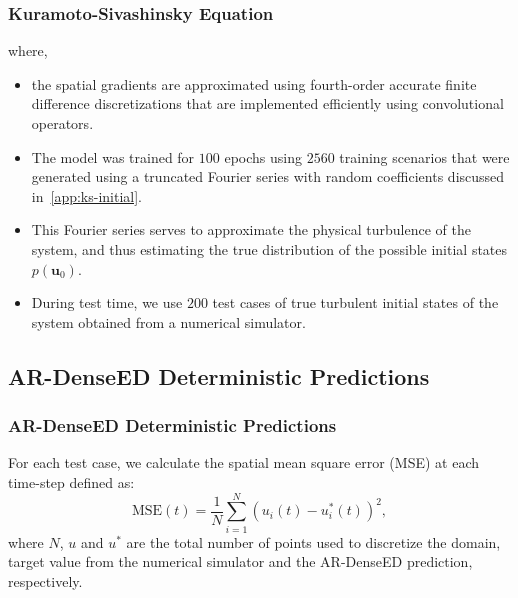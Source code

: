 \documentclass{beamer}
\theoremstyle{remark}
\begin{document}
\begin{frame}
\frametitle{Kuramoto-Sivashinsky Equation}
where,
\begin{itemize}
\item{ the spatial gradients are approximated using fourth-order accurate finite difference discretizations that are implemented efficiently using convolutional operators.}

\item{The model was trained for $100$ epochs using $2560$ training scenarios that were generated using a truncated Fourier series with random coefficients discussed in~\ref{app:ks-initial}.}

\item{This Fourier series serves to approximate the physical turbulence of the system, and thus estimating the true distribution of the possible initial states $p(\bm{u}_{0})$.}

\item{During test time, we use $200$ test cases of true turbulent initial states of the system obtained from a numerical simulator.}

\end{itemize}
\end{frame}
\subsection{AR-DenseED Deterministic Predictions}

\begin{frame}
\frametitle{AR-DenseED Deterministic Predictions}
For each test case, we calculate the spatial mean square error (MSE) at each time-step defined as:
\begin{equation}
    \textrm{MSE}(t) = \frac{1}{N}\sum^{N}_{i=1}\left(u_{i}(t)-u^{*}_{i}(t)\right)^{2},
    \label{eq:mse}
\end{equation}
where $N$, $u$ and $u^*$ are the total number of points used to discretize the domain, target value from the numerical simulator and the AR-DenseED prediction, respectively.
\end{frame}
\end{document}

